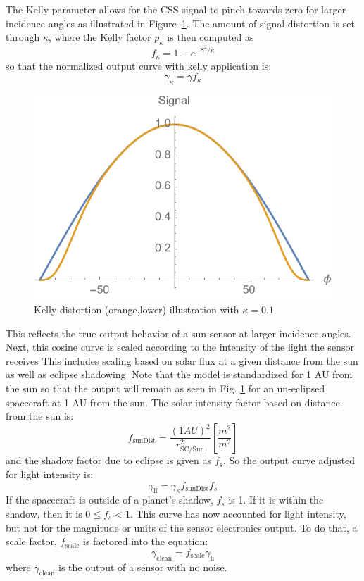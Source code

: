 The Kelly parameter allows for the CSS signal to pinch towards zero for larger incidence angles as illustrated in Figure~\ref{fig:kelly}.  The amount of signal distortion is set through $\kappa$, where the Kelly factor $p_{\kappa}$ is then computed as 
\begin{equation}
f_{\kappa} = 1 - e^{-\hat\gamma^{2}/\kappa}
\end{equation}
so that the normalized output curve with kelly application is:
\begin{equation}
\gamma_{\kappa} = \gamma f_{\kappa}
\end{equation}
\begin{figure}[htb]
	\centerline{
		\includegraphics[]{Figures/kelly}
	}
	\caption{Kelly distortion (orange,lower) illustration with $\kappa = 0.1$}
	\label{fig:kelly}
\end{figure}
This reflects the true output behavior of a sun sensor at larger incidence angles. Next, this cosine curve is scaled according to the intensity of the light the sensor receives This includes scaling based on solar flux at a given distance from the sun as well as eclipse shadowing. Note that the model is standardized for 1 AU from the sun so that the output will remain as seen in Fig. \ref{fig:kelly} for an un-eclipsed spacecraft at 1 AU from the sun.
The solar intensity factor based on distance from the sun is:
\begin{equation}
	f_{\mathrm{sunDist}} = \frac{(1 AU)^2}{r_\mathrm{SC/Sun}^2} [\frac{m^2}{m^2}]
\end{equation}
and the shadow factor due to eclipse is given as $f_s$. So the output curve adjusted for light intensity is:
\begin{equation}
	\gamma_{\textrm{li}} = \gamma_{\kappa} f_{\mathrm{sunDist}} f_s 
\end{equation}
If the spacecraft is outside of a planet's shadow, $f_s$ is 1.  If it is within the shadow, then it is $0\le f_{s} < 1$. 
This curve has now accounted for light intensity, but not for the magnitude or units of the sensor electronics output. To do that, a scale factor, $f_{\mathrm{scale}}$ is factored into the equation:
\begin{equation}
	\gamma_{\mathrm{clean}} = f_{\mathrm{scale}} \gamma_{\textrm{li}}
\end{equation}
where $\gamma_{\mathrm{clean}}$ is the output of a sensor with no noise.

